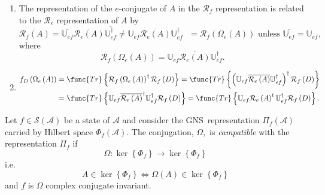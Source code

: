 \documentclass[aps,preprint]{revtex4}
\begin{document}
\begin{enumerate}
\item The representation of the $e$-conjugate of $A$ in the $\mathcal{R}_{f}$
representation is related to the $\mathcal{R}_{e}$ representation of $A$ by 
\begin{equation}
\overline{\mathcal{R}_{f}\left( A\right) }=\overline{\mathbb{U}_{ef}}%
\overline{\mathcal{R}_{e}\left( A\right) }\overline{\mathbb{U}_{ef}^{\dagger}%
}\neq\mathbb{U}_{ef}\overline{\mathcal{R}_{e}\left( A\right) }\mathbb{U}%
_{ef}^{\dagger}\text{ }=\mathcal{R}_{f}\left( \Omega_{e}\left( A\right)
\right) \text{ unless }\overline{\mathbb{U}_{ef}}=\mathbb{U}_{ef},
\end{equation}
where%
\begin{equation}
\mathcal{R}_{f}\left( \Omega_{e}\left( A\right) \right) =\mathbb{U}_{ef}%
\overline{\mathcal{R}_{e}\left( A\right) }\mathbb{U}_{ef}^{\dagger}.
\end{equation}

\item 
\begin{align}
f_{D}\left( \Omega_{e}\left( A\right) \right) & =\func{Tr}\left\{ \mathcal{R}%
_{f}\left( \Omega_{e}\left( A\right) \right) ^{\dagger}\mathcal{R}_{f}\left(
D\right) \right\} =\func{Tr}\left\{ \left( \mathbb{U}_{ef}\overline{\mathcal{%
R}_{e}\left( A\right) }\mathbb{U}_{ef}^{\dagger}\right) ^{\dagger}\mathcal{R}%
_{f}\left( D\right) \right\} \\
& =\func{Tr}\left\{ \mathbb{U}_{ef}\overline{\mathcal{R}_{e}\left( A\right) }%
^{\dagger}\mathbb{U}_{ef}^{\dagger}\mathcal{R}_{f}\left( D\right) \right\} =%
\func{Tr}\left\{ \mathbb{U}_{ef}\mathcal{R}_{e}\left( A\right) ^{t}\mathbb{U}%
_{ef}^{\dagger}\mathcal{R}_{f}\left( D\right) \right\} .
\end{align}
\end{enumerate}

Let $f\in\mathcal{S}\left( \mathcal{A}\right) $ be a state of $\mathcal{A}$
and consider the GNS\ representation $\Pi_{f}\left( \mathcal{A}\right) $
carried by Hilbert space $\Phi_{f}\left( \mathcal{A}\right) .$ The
conjugation, $\Omega,$ is \emph{campatible} with the representation $\Pi_{f}$
if 
\begin{equation}
\Omega:\ker\left\{ \Phi_{f}\right\} \rightarrow\ker\left\{ \Phi _{f}\right\}
\end{equation}
i.e. 
\begin{equation}
A\in\ker\left\{ \Phi_{f}\right\} \Leftrightarrow\Omega\left( A\right)
\in\ker\left\{ \Phi_{f}\right\}
\end{equation}
and $f$ is $\Omega$ complex conjugate invariant.
\end{document}
